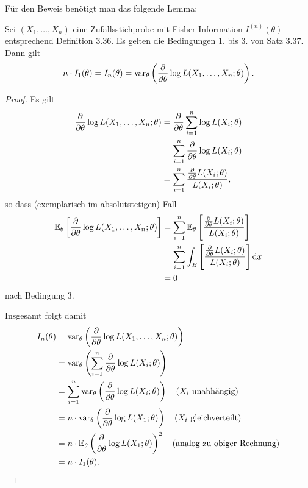 Für den Beweis benötigt man das folgende Lemma:
\begin{lem}
  Sei $(X_1, \ldots, X_n)$ eine Zufallsstichprobe mit Fisher-Information
  $I^{(n)}(\theta)$ entsprechend Definition 3.36. Es gelten die Bedingungen 1.
  bis 3. von Satz 3.37. Dann gilt
  \[ n \cdot I_1(\theta) = I_n(\theta) = \operatorname{var}_\theta\left(
    \frac{\partial }{\partial \theta} \log L(X_1, \ldots, X_n; \theta) \right). \]
\end{lem}

\begin{proof}
  Es gilt
  \begin{align*}
    \frac{\partial }{\partial \theta} \log L(X_1, \ldots, X_n; \theta)
    &= \frac{\partial }{\partial \theta} \sum_{i=1}^n \log L(X_i; \theta) \\
    &= \sum_{i=1}^n \frac{\partial }{\partial \theta}  \log L(X_i; \theta) \\
    &= \sum_{i=1}^n \frac{\frac{\partial }{\partial \theta} L(X_i; \theta)}{L(X_i; \theta)},
  \end{align*}
  so dass (exemplarisch im absolutstetigen) Fall
  \begin{align*}
    \mathbb{E}_\theta \left[ \frac{\partial }{\partial \theta} \log L(X_1, \ldots, X_n; \theta) \right]
    &= \sum_{i=1}^n \mathbb{E}_\theta
      \left[ \frac{\frac{\partial }{\partial \theta} L(X_i; \theta)}{L(X_i; \theta)} \right] \\
    &= \sum_{i=1}^n \int_B
      \left[ \frac{\frac{\partial }{\partial \theta} L(X_i; \theta)}{L(X_i; \theta)} \right]
      \mathrm{d} x \\
    &= 0
  \end{align*}
  nach Bedingung 3.

  Insgesamt folgt damit
  \begin{align*}
    I_n(\theta)
    &= \operatorname{var}_\theta \left( \frac{\partial }{\partial \theta}
      \log L(X_1, \ldots, X_n; \theta) \right) \\
    &= \operatorname{var}_\theta \left( \sum_{i=1}^n \frac{\partial }{\partial \theta}
      \log L(X_i; \theta) \right) \\
    &= \sum_{i=1}^n \operatorname{var}_\theta \left( \frac{\partial }{\partial \theta}
      \log L(X_i; \theta) \right)
      \quad \text{($X_i$ unabhängig)} \\
    &= n \cdot \operatorname{var}_\theta \left( \frac{\partial }{\partial \theta}
      \log L(X_1; \theta) \right)
      \quad \text{($X_i$ gleichverteilt)} \\
    &= n \cdot \mathbb{E}_\theta \left( \frac{\partial }{\partial \theta}
      \log L(X_1; \theta) \right)^2
      \quad \text{(analog zu obiger Rechnung)} \\
    &= n \cdot I_1(\theta). \qedhere
  \end{align*}
\end{proof}

